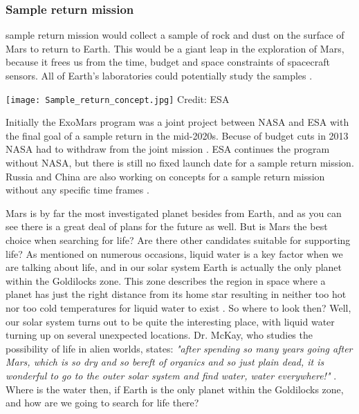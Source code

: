 \begin{multicols}{2}
\subsubsection{Sample return mission}

 sample return mission would collect a sample of rock and dust on the surface of Mars to return to Earth.
This would be a giant leap in the exploration of Mars, because it frees us from the time, budget and space constraints of spacecraft sensors.
All of Earth's laboratories could potentially study the samples \cite{EarthAnalysis}.
 
\begin{center}
	\texttt{[image: Sample\_return\_concept.jpg]}
	\tiny{Credit: ESA}
\end{center}

Initially the ExoMars program was a joint project between NASA and ESA with the final goal of a sample return in the mid-2020s.
Becuse of budget cuts in 2013 NASA had to withdraw from the joint mission \cite{FPlan16}.
ESA continues the program without NASA, but there is still no fixed launch date for a sample return mission.
Russia and China are also working on concepts for a sample return mission without any specific time frames \cite{RussiaPlan} \cite{ChinaPlan}.

Mars is by far the most investigated planet besides from Earth, and as you can see there is a great deal of plans for the future as well.
But is Mars the best choice when searching for life?
Are there other candidates suitable for supporting life? 
As mentioned on numerous occasions, liquid water is a key factor when we are talking about life, and in our solar system Earth is actually the only planet within the Goldilocks zone.
This zone describes the region in space where a planet has just the right distance from its home star resulting in neither too hot nor too cold temperatures for liquid water to exist \cite{FPlan26}.
So where to look then?
Well, our solar system turns out to be quite the interesting place, with liquid water turning up on several unexpected locations. 
Dr. McKay, who studies the possibility of life in alien worlds, states: \emph{"after spending so many years going after Mars, which is so dry and so bereft of organics and so just plain dead, it is wonderful to go to the outer solar system and find water, water everywhere!"} \cite{FPlan09}.
Where is the water then, if Earth is the only planet within the Goldilocks zone, and how are we going to search for life there?


\end{multicols}
